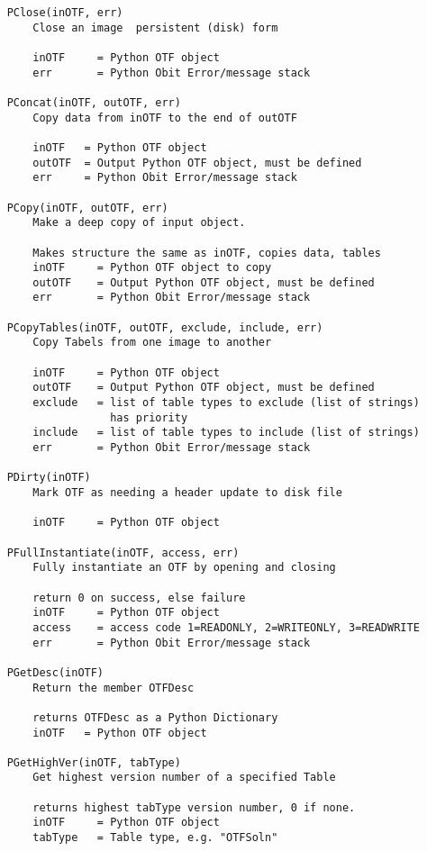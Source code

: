 \documentclass[11pt]{report}
\begin{document}
\begin{verbatim}
    PClose(inOTF, err)
        Close an image  persistent (disk) form
        
        inOTF     = Python OTF object
        err       = Python Obit Error/message stack
    
    PConcat(inOTF, outOTF, err)
        Copy data from inOTF to the end of outOTF
        
        inOTF   = Python OTF object
        outOTF  = Output Python OTF object, must be defined
        err     = Python Obit Error/message stack
    
    PCopy(inOTF, outOTF, err)
        Make a deep copy of input object.
        
        Makes structure the same as inOTF, copies data, tables
        inOTF     = Python OTF object to copy
        outOTF    = Output Python OTF object, must be defined
        err       = Python Obit Error/message stack
    
    PCopyTables(inOTF, outOTF, exclude, include, err)
        Copy Tabels from one image to another
        
        inOTF     = Python OTF object
        outOTF    = Output Python OTF object, must be defined
        exclude   = list of table types to exclude (list of strings)
                    has priority
        include   = list of table types to include (list of strings)
        err       = Python Obit Error/message stack
    
    PDirty(inOTF)
        Mark OTF as needing a header update to disk file
        
        inOTF     = Python OTF object
    
    PFullInstantiate(inOTF, access, err)
        Fully instantiate an OTF by opening and closing
        
        return 0 on success, else failure
        inOTF     = Python OTF object
        access    = access code 1=READONLY, 2=WRITEONLY, 3=READWRITE
        err       = Python Obit Error/message stack
    
    PGetDesc(inOTF)
        Return the member OTFDesc
        
        returns OTFDesc as a Python Dictionary
        inOTF   = Python OTF object
    
    PGetHighVer(inOTF, tabType)
        Get highest version number of a specified Table
        
        returns highest tabType version number, 0 if none.
        inOTF     = Python OTF object
        tabType   = Table type, e.g. "OTFSoln"
    

\end{verbatim}
\end{document}
